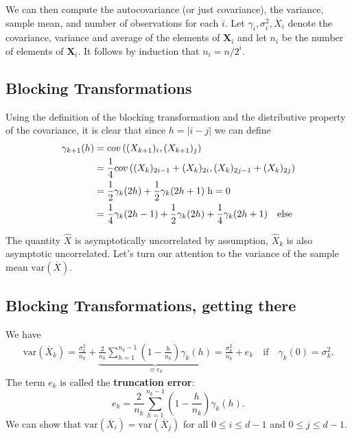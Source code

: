 \documentclass[%
oneside,                 %
final,                   %
10pt]{article}
\begin{document}
We can then compute the autocovariance (or just covariance), the variance, sample mean, and
number of observations for each $i$. 
Let $\gamma_i, \sigma_i^2,
\overline{X}_i$ denote the covariance, variance and average of the
elements of $\bm{X}_i$ and let $n_i$ be the number of elements of
$\bm{X}_i$. It follows by induction that $n_i = n/2^i$. 

\subsection{Blocking Transformations}

Using the
definition of the blocking transformation and the distributive
property of the covariance, it is clear that since $h =|i-j|$
we can define
\begin{align}
\gamma_{k+1}(h) &= cov\left( ({X}_{k+1})_{i}, ({X}_{k+1})_{j} \right) \nonumber \\
&=  \frac{1}{4}cov\left( ({X}_{k})_{2i-1} + ({X}_{k})_{2i}, ({X}_{k})_{2j-1} + ({X}_{k})_{2j} \right) \nonumber \\
&=  \frac{1}{2}\gamma_{k}(2h) + \frac{1}{2}\gamma_k(2h+1) \hspace{0.1cm} \mathrm{h = 0} \\
&=\frac{1}{4}\gamma_k(2h-1) + \frac{1}{2}\gamma_k(2h) + \frac{1}{4}\gamma_k(2h+1) \quad \mathrm{else}
\end{align}

The quantity $\hat{X}$ is asymptotically uncorrelated by assumption, $\hat{X}_k$ is also asymptotic uncorrelated. Let's turn our attention to the variance of the sample
mean $\mathrm{var}(\overline{X})$. 

\subsection{Blocking Transformations, getting there}
We have
\begin{align}
\mathrm{var}(\overline{X}_k) = \frac{\sigma_k^2}{n_k} + \underbrace{\frac{2}{n_k} \sum_{h=1}^{n_k-1}\left( 1 - \frac{h}{n_k} \right)\gamma_k(h)}_{\equiv e_k} = \frac{\sigma^2_k}{n_k} + e_k \quad \text{if} \quad \gamma_k(0) = \sigma_k^2. 
\end{align}
The term $e_k$ is called the \textbf{truncation error}: 
\begin{equation}
e_k = \frac{2}{n_k} \sum_{h=1}^{n_k-1}\left( 1 - \frac{h}{n_k} \right)\gamma_k(h). 
\end{equation}
We can show that $\mathrm{var}(\overline{X}_i) = \mathrm{var}(\overline{X}_j)$ for all $0 \leq i \leq d-1$ and $0 \leq j \leq d-1$. 
\end{document}
